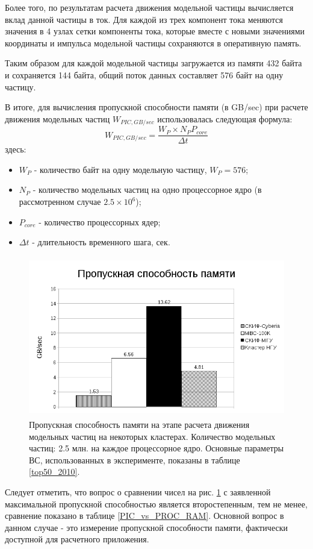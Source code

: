 Более того, по результатам расчета движения модельной частицы вычисляется вклад данной частицы в ток. Для каждой из трех компонент тока меняются значения в 4 узлах сетки компоненты тока, которые вместе с новыми значениями координаты и импульса модельной частицы сохраняются в оперативную память.

Таким образом для каждой модельной частицы загружается из памяти 432 байта и сохраняется 144 байта, общий поток данных составляет 576 байт на одну частицу.

В итоге, для вычисления пропускной способности памяти (в GB/sec) при расчете движения модельных частиц $W_{PIC,GB/sec}$ использовалась следующая формула:
\begin{equation}
W_{PIC,GB/sec} = \frac{W_P\times N_P P_{core}}{\Delta t}
\label{RAM_performance}
\end{equation}
здесь:
\begin{itemize}
	\item $W_P$ - количество байт на одну модельную частицу, $W_P = 576$;
	\item $N_P$ - количество модельных частиц на одно процессорное ядро (в рассмотренном случае $2.5\times 10^6$);  
	\item $P_{core}$ - количество процессорных ядер;
	\item $\Delta t$  - длительность временного шага, сек.
\end{itemize}	




\begin{figure}[htb]
	\begin{center}
		\includegraphics[height=7cm,keepaspectratio]{images/data_proc_throughput_GBsec.png}
	\end{center}
	\caption{Пропускная способность памяти на этапе расчета движения модельных частиц на некоторых кластерах. Количество модельных частиц: 2.5 млн. на каждое процессорное ядро. Основные параметры ВС, использованных в эксперименте, показаны в таблице \ref{top50_2010}.}
	\label{PIC_RAM}
\end{figure}
Следует отметить, что вопрос о сравнении чисел на рис. \ref{PIC_RAM} с заявленной максимальной пропускной способностью 
является второстепенным, тем не менее, сравнение показано в таблице \ref{PIC_vs_PROC_RAM}. Основной вопрос в данном случае - это измерение пропускной способности памяти,  фактически доступной для расчетного приложения.

